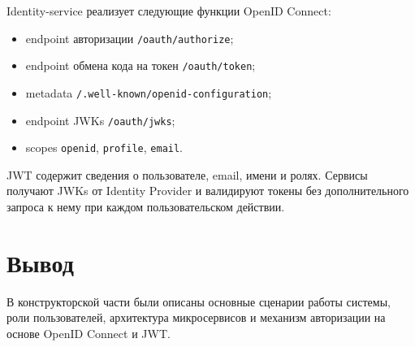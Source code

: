 Identity-service реализует следующие функции OpenID Connect:

\begin{itemize}
  \item endpoint авторизации \texttt{/oauth/authorize};
  \item endpoint обмена кода на токен \texttt{/oauth/token};
  \item metadata \texttt{/.well-known/openid-configuration};
  \item endpoint JWKs \texttt{/oauth/jwks};
  \item scopes \texttt{openid}, \texttt{profile}, \texttt{email}.
\end{itemize}

JWT содержит сведения о пользователе, email, имени и ролях. Сервисы получают JWKs от Identity Provider и валидируют токены без дополнительного запроса к нему при каждом пользовательском действии.

\section{Вывод}

В конструкторской части были описаны основные сценарии работы системы, роли пользователей, архитектура микросервисов и механизм авторизации на основе OpenID Connect и JWT.
